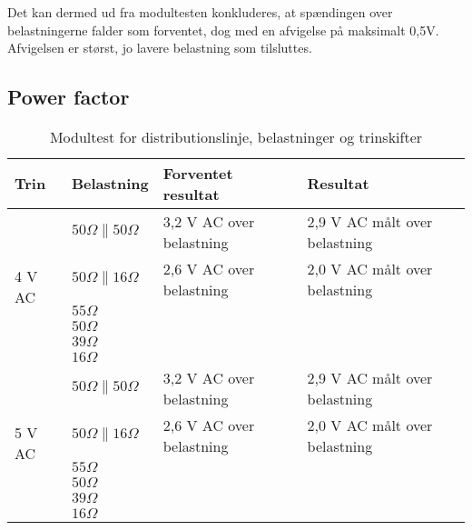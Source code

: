 Det kan dermed ud fra modultesten konkluderes, at spændingen over belastningerne falder som forventet, dog med en afvigelse på maksimalt 0,5V. Afvigelsen er størst, jo lavere belastning som tilsluttes. 


\subsection{Power factor}


\begin{table}[H]
	\centering
	\begin{tabular}{|l|l|l|l|}
		\hline
		\textbf{Trin} & \textbf{Belastning} & \textbf{Forventet resultat} & \textbf{Resultat} \\\hline
		
		\multirow{6}{*}{4 V AC} 
		& $50 \Omega\parallel 50 \Omega$ & 3,2 V AC over belastning & 2,9 V AC målt over belastning \\\hhline{~---} 	
		& $50 \Omega\parallel 16 \Omega$ & 2,6 V AC over belastning & 2,0 V AC målt over belastning \\\hhline{~---}
		& $55 \Omega$ &  &  \\\hhline{~---} 
		& $50 \Omega$ &  &  \\\hhline{~---} 	
		& $39 \Omega$ &  &  \\\hhline{~---} 
		& $16 \Omega$ &  &  \\\hline 
		
		
		\multirow{6}{*}{5 V AC} 
		& $50 \Omega\parallel 50 \Omega$ & 3,2 V AC over belastning & 2,9 V AC målt over belastning \\\hhline{~---} 	
		& $50 \Omega\parallel 16 \Omega$ & 2,6 V AC over belastning & 2,0 V AC målt over belastning \\\hhline{~---}
		& $55 \Omega$ &  &  \\\hhline{~---} 
		& $50 \Omega$ &  &  \\\hhline{~---} 	
		& $39 \Omega$ &  &  \\\hhline{~---} 
		& $16 \Omega$ &  &  \\\hline 

		
	\end{tabular}
	\caption{Modultest for distributionslinje, belastninger og trinskifter}
	\label{tab:Modultesttrin}
\end{table}